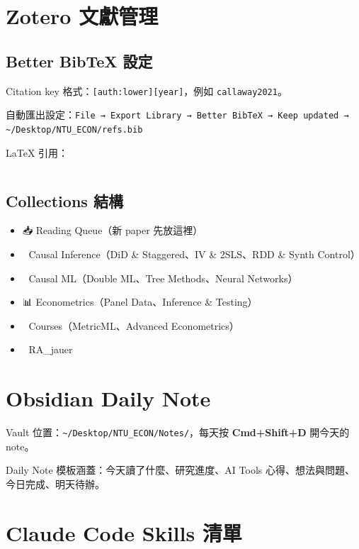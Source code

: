\documentclass[12pt, a4paper]{article}
\begin{document}
\section{Zotero 文獻管理}

\subsection{Better BibTeX 設定}

Citation key 格式：\texttt{[auth:lower][year]}，例如 \texttt{callaway2021}。

自動匯出設定：\texttt{File → Export Library → Better BibTeX → Keep updated → \textasciitilde/Desktop/NTU\_ECON/refs.bib}

LaTeX 引用：
\begin{lstlisting}[language=tex]

\end{lstlisting}

\subsection{Collections 結構}

\begin{itemize}
  \item 📥 Reading Queue（新 paper 先放這裡）
  \item 📐 Causal Inference（DiD \& Staggered、IV \& 2SLS、RDD \& Synth Control）
  \item 🤖 Causal ML（Double ML、Tree Methods、Neural Networks）
  \item 📊 Econometrics（Panel Data、Inference \& Testing）
  \item 🏫 Courses（MetricML、Advanced Econometrics）
  \item 🔬 RA\_jauer
\end{itemize}

\section{Obsidian Daily Note}

Vault 位置：\texttt{\textasciitilde/Desktop/NTU\_ECON/Notes/}，每天按 \textbf{Cmd+Shift+D} 開今天的 note。

Daily Note 模板涵蓋：今天讀了什麼、研究進度、AI Tools 心得、想法與問題、今日完成、明天待辦。

\section{Claude Code Skills 清單}
\end{document}
